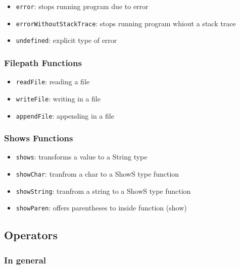 \documentclass[a4paper, titlepage, twoside]{article}
\begin{document}
\begin{itemize}
\item \texttt{error}: stops running program due to error

\item \texttt{errorWithoutStackTrace}: stops running program whiout a stack trace

\item \texttt{undefined}: explicit type of error
\end{itemize}

\subsubsection{Filepath Functions}
\label{sec:org710153b}

\begin{itemize}
\item \texttt{readFile}: reading a file

\item \texttt{writeFile}: writing in a file

\item \texttt{appendFile}: appending in a file
\end{itemize}

\subsubsection{Shows Functions}
\label{sec:org5620c4b}

\begin{itemize}
\item \texttt{shows}: transforms a value to a String type

\item \texttt{showChar}: tranfrom a char to a ShowS type function

\item \texttt{showString}: tranfrom a string to a ShowS type function

\item \texttt{showParen}: offers parentheses to inside function (show)
\end{itemize}

\subsection{Operators}
\label{sec:orge9ccd8b}

\subsubsection{In general}
\label{sec:org1b11e92}
\end{document}
